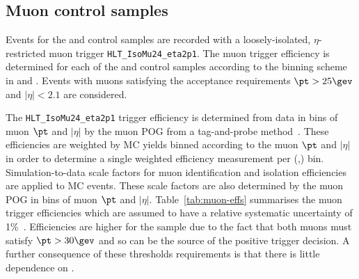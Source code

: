 \subsection{Muon control samples\label{sec:muon_control_triggers}}

Events for the \mj and \mmj control samples are recorded with a loosely-isolated,
$\eta$-restricted muon trigger \verb!HLT_IsoMu24_eta2p1!. The muon
trigger efficiency is determined for each of the \mj and \mmj control
samples according to the binning scheme in \njet and \scalht. Events
with muons satisfying the acceptance requirements $\pt > 25\gev$ and
$|\eta| < 2.1$ are considered.

The \verb!HLT_IsoMu24_eta2p1! trigger efficiency is determined from
data in bins of muon $\pt$ and $|\eta|$ by the muon POG from a
tag-and-probe method~\cite{ref:muon-eff}. These efficiencies are
weighted by MC yields binned according to the muon $\pt$ and $|\eta|$
in order to determine a single weighted efficiency measurement per
(\njet,\scalht) bin. Simulation-to-data scale factors for muon
identification and isolation efficiencies are applied to MC
events. These scale factors are also determined by the muon POG in
bins of muon $\pt$ and $|\eta|$. Table~\ref{tab:muon-effs} summarises
the muon trigger efficiencies which are assumed to have a relative
systematic uncertainty of 1\%~\cite{ref:muon-eff}. Efficiencies are
higher for the \mmj sample due to the fact that both muons must
satisfy $\pt > 30\gev$ and so can be the source of the positive
trigger decision. A further consequence of these thresholds
requirements is that there is little dependence on \scalht. 

